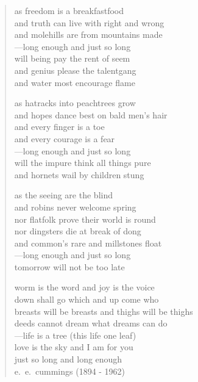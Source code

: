 
\begin{center}

\hspace{5em}\begin{verse}
as freedom is a breakfastfood\\
and truth can live with right and wrong\\
and molehills are from mountains made\\
---long enough and just so long\\
will being pay the rent of seem\\
and genius please the talentgang\\
and water most encourage flame\\
\vspace{1em}

as hatracks into peachtrees grow\\
and hopes dance best on bald men's hair\\
and every finger is a toe\\
and every courage is a fear\\
---long enough and just so long\\
will the impure think all things pure\\
and hornets wail by children stung\\
\vspace{1em}

as the seeing are the blind\\
and robins never welcome spring\\
nor flatfolk prove their world is round\\
nor dingsters die at break of dong\\
and common's rare and millstones float\\
---long enough and just so long\\
tomorrow will not be too late\\
\vspace{1em}

worm is the word and joy is the voice\\
down shall go which and up come who\\
breasts will be breasts and thighs will be thighs\\
deeds cannot dream what dreams can do\\
---life is a tree (this life one leaf)\\
love is the sky and I am for you\\
just so long and long enough\\
\vspace{1em}
\hspace{20em}e.~e.~cummings (1894 - 1962)
\end{verse}

\end{center}

